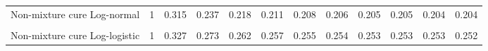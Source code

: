 \documentclass[
]{article}
\begin{document}
\begin{table}[H]
{\begin{tabular}[t]{lrrrrrrrrrrr}
Non-mixture cure Log-normal & 1 & 0.315 & 0.237 & 0.218 & 0.211 & 0.208 & 0.206 & 0.205 & 0.205 & 0.204 & 0.204\\
\cellcolor{gray!10}{Mixture cure Log-logistic} & \cellcolor{gray!10}{1} & \cellcolor{gray!10}{0.318} & \cellcolor{gray!10}{0.258} & \cellcolor{gray!10}{0.246} & \cellcolor{gray!10}{0.241} & \cellcolor{gray!10}{0.238} & \cellcolor{gray!10}{0.237} & \cellcolor{gray!10}{0.236} & \cellcolor{gray!10}{0.236} & \cellcolor{gray!10}{0.236} & \cellcolor{gray!10}{0.235}\\
Non-mixture cure Log-logistic & 1 & 0.327 & 0.273 & 0.262 & 0.257 & 0.255 & 0.254 & 0.253 & 0.253 & 0.253 & 0.252\\
\bottomrule
\end{tabular}}
\end{table}
\end{document}
